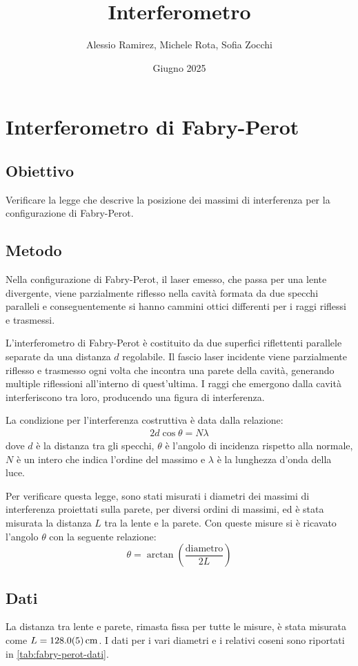 \documentclass[a4paper]{article}
\title{Interferometro}
\author{Alessio Ramirez, Michele Rota, Sofia Zocchi}
\date{Giugno 2025}
\begin{document}
\maketitle
\tableofcontents
\newpage

\section{Interferometro di Fabry-Perot}
\subsection{Obiettivo}
Verificare la legge che descrive la posizione dei massimi di interferenza per la configurazione di Fabry-Perot.

\subsection{Metodo}
Nella configurazione di Fabry-Perot, il laser emesso, che passa per una lente divergente, viene parzialmente riflesso nella cavità formata da due specchi paralleli e conseguentemente si hanno cammini ottici differenti per i raggi riflessi e trasmessi. 

L'interferometro di Fabry-Perot è costituito da due superfici riflettenti parallele separate da una distanza $d$ regolabile. Il fascio laser incidente viene parzialmente riflesso e trasmesso ogni volta che incontra una parete della cavità, generando multiple riflessioni all'interno di quest'ultima. I raggi che emergono dalla cavità interferiscono tra loro, producendo una figura di interferenza.

La condizione per l'interferenza costruttiva è data dalla relazione:
\begin{align}
    2d \cos \theta = N\lambda
\end{align}
dove $d$ è la distanza tra gli specchi, $\theta$ è l'angolo di incidenza rispetto alla normale, $N$ è un intero che indica l'ordine del massimo e $\lambda$ è la lunghezza d'onda della luce.

Per verificare questa legge, sono stati misurati i diametri dei massimi di interferenza proiettati sulla parete, per diversi ordini di massimi, ed è stata misurata la distanza $L$ tra la lente e la parete. Con queste misure si è ricavato l'angolo $\theta$ con la seguente relazione:
\[\theta = \arctan \left(\frac{\text{diametro}}{2L}\right)\]

\subsection{Dati}
La distanza tra lente e parete, rimasta fissa per tutte le misure, è stata misurata come $L=\SI{128 \pm 0.5}{\centi\meter}$. I dati per i vari diametri e i relativi coseni sono riportati in \cref{tab:fabry-perot-dati}.
\end{document}
